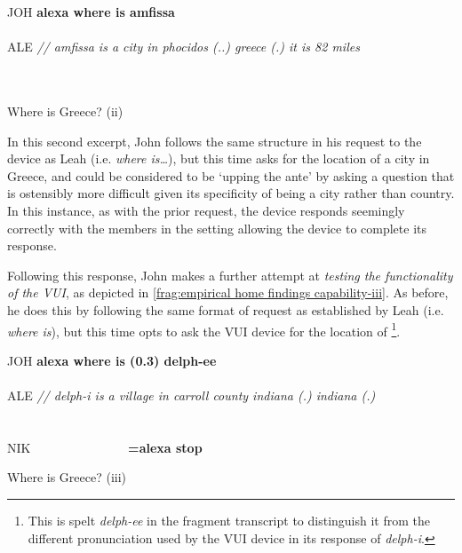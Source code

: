 \begin{inlinefrag}
    {
    \begin{transcript}[9]
        \by JOH {\textbf{alexa where is amfissa}} \\
         \\
        \by ALE {\textit{// amfissa is a city in phocidos (..) greece (.) it is 82 miles}} \\
         \\
         \\
    \end{transcript}
    \caption{Where is Greece? (ii)}\label{frag:empirical home findings capability-ii}
    }
\end{inlinefrag}

\begin{revisedsubmission}
In this second excerpt, John follows the same structure in his request to the device as Leah (i.e. \textit{where is\ldots}), but this time asks for the location of a city in Greece, and could be considered to be `upping the ante' by asking a question that is ostensibly more difficult given its specificity of being a city rather than country.
In this instance, as with the prior request, the device responds seemingly correctly with the members in the setting allowing the device to complete its response.

Following this response, John makes a further attempt at \textit{testing the functionality of the \ac{VUI}}, as depicted in \autoref{frag:empirical home findings capability-iii}.
As before, he does this by following the same format of request as established by Leah (i.e. \textit{where is}), but this time opts to ask the \ac{VUI} device for the location of \footnote{This is spelt \textit{delph-ee} in the fragment transcript to distinguish it from the different pronunciation used by the \ac{VUI} device in its response of \textit{delph-i}.}.
\end{revisedsubmission}

\begin{inlinefrag}
    {
    \begin{transcript}[15]
        \by JOH {\textbf{alexa where is (0.3) delph-ee}} \\
         \\
        \by ALE {\textit{// delph-i is a village in carroll county indiana (.) indiana (.)}} \\
         \\
         \\
        \by NIK {~~~~~~~~~~~~~~~\textbf{=alexa stop}} \\
    \end{transcript}
    \caption{Where is Greece? (iii)}\label{frag:empirical home findings capability-iii}
    }
\end{inlinefrag}

